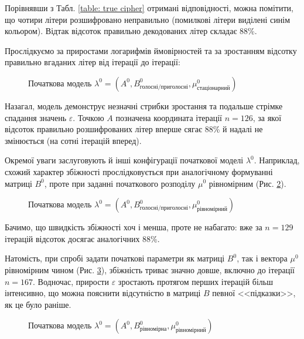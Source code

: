 Порівнявши з Табл. \ref{table: true cipher} отримані відповідності, можна помітити, що чотири літери розшифровано неправильно (помилкові літери виділені синім кольором). Відтак відсоток правильно декодованих літер складає 88\%.

\newpage
Прослідкуємо за приростами логарифмів ймовірностей та за зростанням відсотку правильно вгаданих літер від ітерації до ітерації:

\begin{figure}[H]
    \caption{Початкова модель $\lambda^0=(A^0,B^0_\text{голосні/приголосні},\mu^0_\text{стаціонарний})$}
    \label{figure: Bvc + Minv}
\end{figure}

Назагал, модель демонструє незначні стрибки зростання та подальше стрімке спадання значень $\varepsilon$. Точкою $A$ позначена координата ітерації $n=126$, за якої відсоток правильно розшифрованих літер вперше сягає 88\% й надалі не змінюється (на сотні ітерацій вперед).

Окремої уваги заслуговують й інші конфігурації початкової моделі $\lambda^0$. Наприклад, схожий характер збіжності прослідковується при аналогічному формуванні матриці $B^0$, проте при заданні початкового розподілу $\mu^0$ рівномірним (Рис. \ref{figure: Bvc + Muni}).

\begin{figure}[H]
    \caption{Початкова модель $\lambda^0=(A^0,B^0_\text{голосні/приголосні},\mu^0_\text{рівномірний})$}
    \label{figure: Bvc + Muni}
\end{figure}

Бачимо, що швидкість збіжності хоч і менша, проте не набагато: вже за $n=129$ ітерацій відсоток досягає аналогічних 88\%. 

Натомість, при спробі задати початкові параметри як матриці $B^0$, так і вектора $\mu^0$ рівномірним чином (Рис. \ref{figure: Buni + Muni}), збіжність триває значно довше, включно до ітерації $n=167$. Водночас, прирости $\varepsilon$ зростають протягом перших ітерацій більш інтенсивно, що можна пояснити відсутністю в матриці $B$ певної <<підказки>>, як це було раніше. 

\begin{figure}[H]
    \caption{Початкова модель $\lambda^0=(A^0,B^0_\text{рівномірна},\mu^0_\text{рівномірний})$}
    \label{figure: Buni + Muni}
\end{figure}


